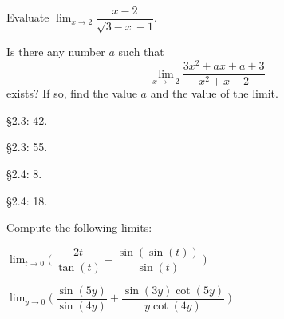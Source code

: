\documentclass[unboxed]{hwset}
\begin{document}
\begin{problem}[1.]
	\be 
		\item Evaluate $\lim_{x\to 2}\dfrac{x-2}{\sqrt{3-x}-1}$.
		\item Is there any number $a$ such that
		\begin{equation*}
			\lim_{x\to-2}\dfrac{3x^{2}+ax+a+3}{x^2+x-2}
		\end{equation*}
		exists? If so, find the value $a$ and the value of the limit.
	\ee
\end{problem}

\begin{problem}[2.]\S 2.3: 42.
\end{problem}

\begin{problem}[3.]\S 2.3: 55.
\end{problem}

\begin{problem}[4.]\S 2.4: 8.
\end{problem}

\begin{problem}[5.]\S 2.4: 18.
\end{problem}

\begin{problem}[6.]Compute the following limits:
	\be
		\item $\lim_{t\to0}\Big(\ \dfrac{2t}{\tan(t)}-\dfrac{\sin(\sin(t))}{\sin(t)}\ \Big)$
		\item $\lim_{y\to0}\Big(\ \dfrac{\sin(5y)}{\sin(4y)}+\dfrac{\sin(3y)\cot(5y)}{y\cot(4y)}\ \Big)$\\
	\ee
\end{problem}
\end{document}
